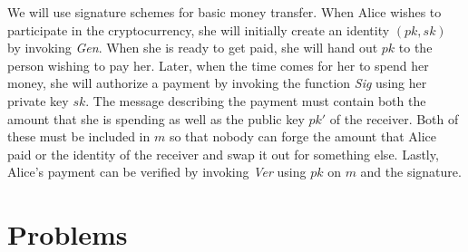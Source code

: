 We will use signature schemes for basic money transfer. When Alice wishes to participate
in the cryptocurrency, she will initially create an identity $(pk, sk)$ by invoking
\emph{Gen}. When she is ready to get paid, she will hand out $pk$ to the person wishing to
pay her. Later, when the time comes for her to spend her money, she will authorize a payment
by invoking the function \emph{Sig} using her private key $sk$. The message describing
the payment must contain both the amount that she is spending as well as the public key
$pk'$ of the receiver. Both of these must be included in $m$ so that nobody can forge
the amount that Alice paid or the identity of the receiver and swap it out for something
else. Lastly, Alice's payment can be verified by invoking \emph{Ver} using $pk$ on $m$ and the signature.

\section*{Problems}

